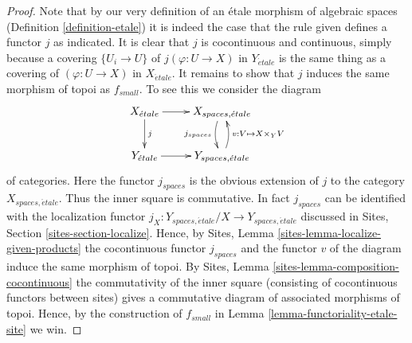 \documentclass[10pt,a4paper]{amsart}
\theoremstyle{plain}
\theoremstyle{definition}
\theoremstyle{remark}
\numberwithin{equation}{subsection}
\def\etale{{\acute{e}tale}}
\begin{document}
\begin{proof}
Note that by our very definition of an \'etale morphism of algebraic spaces
(Definition \ref{definition-etale}) it is
indeed the case that the rule given defines a functor $j$ as indicated.
It is clear that $j$ is cocontinuous and continuous, simply because a covering
$\{U_i \to U\}$ of $j(\varphi : U \to X)$ in $Y_\etale$ is the
same thing as a covering of $(\varphi : U \to X)$ in $X_\etale$. It
remains to show that $j$ induces the same morphism of topoi as $f_{small}$.
To see this we consider the diagram
$$
\xymatrix{
X_\etale \ar[r] \ar[d]^j &
X_{spaces, \etale} \ar@/_/[d]_{j_{spaces}} \\
Y_\etale \ar[r] &
Y_{spaces, \etale} \ar@/_/[u]_{v : V \mapsto X \times_Y V}
}
$$
of categories. Here the functor $j_{spaces}$ is the obvious extension of $j$
to the category $X_{spaces, \etale}$. Thus the inner square is
commutative. In fact $j_{spaces}$ can be identified with the
localization functor
$j_X : Y_{spaces, \etale}/X \to Y_{spaces, \etale}$
discussed in
Sites, Section \ref{sites-section-localize}.
Hence, by
Sites, Lemma \ref{sites-lemma-localize-given-products}
the cocontinuous functor $j_{spaces}$ and the functor $v$ of the diagram
induce the same morphism of topoi. By
Sites, Lemma \ref{sites-lemma-composition-cocontinuous}
the commutativity of the inner square (consisting of cocontinuous functors
between sites) gives a commutative diagram of associated morphisms of topoi.
Hence, by the construction of $f_{small}$ in
Lemma \ref{lemma-functoriality-etale-site} we win.
\end{proof}
\end{document}

